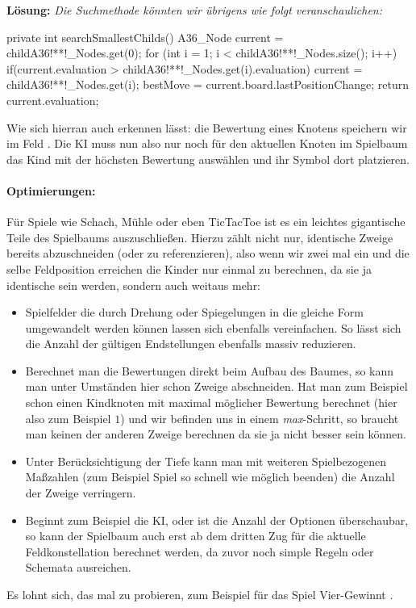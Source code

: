 \documentclass[table]{sopra-base}
\makeatletter
\newenvironment{solution}{\null\par\noindent\textbf{\textcolor{sob@col@uulm@cs}{Lösung:}}\newline\bgroup\color{black}\slshape\ignorespaces}{\egroup}
\makeatother
\begin{document}
\begin{solution}
Die Suchmethode könnten wir übrigens wie folgt veranschaulichen:
\begin{java}[firstnumber=104]
private int searchSmallestChilds(){
    A36_Node current = childA36!**!_Nodes.get(0);
    for (int i = 1; i < childA36!**!_Nodes.size(); i++) {
        if(current.evaluation > childA36!**!_Nodes.get(i).evaluation)
            current = childA36!**!_Nodes.get(i);
    }
    bestMove = current.board.lastPositionChange;
    return current.evaluation;
}
\end{java}
Wie sich hierran auch erkennen lässt: die Bewertung eines Knotens speichern wir im Feld . Die KI muss nun also nur noch für den aktuellen Knoten im Spielbaum das Kind mit der höchsten Bewertung auswählen und ihr Symbol dort platzieren.

\paragraph{Optimierungen:}

Für Spiele wie Schach, Mühle oder eben TicTacToe ist es ein leichtes gigantische Teile des Spielbaums auszuschließen. Hierzu zählt nicht nur, identische Zweige bereits abzuschneiden (oder zu referenzieren), also wenn wir zwei mal ein und die selbe Feldposition erreichen die Kinder nur einmal zu berechnen, da sie ja identische sein werden, sondern auch weitaus mehr:
\begin{itemize}[nolistsep]
    \item Spielfelder die durch Drehung oder Spiegelungen in die gleiche Form umgewandelt werden können lassen sich ebenfalls vereinfachen. So lässt sich die Anzahl der gültigen Endstellungen ebenfalls massiv reduzieren.
    \item Berechnet man die Bewertungen direkt beim Aufbau des Baumes, so kann man unter Umständen hier schon Zweige abschneiden. Hat man zum Beispiel schon einen Kindknoten mit maximal möglicher Bewertung berechnet (hier also zum Beispiel \(1\)) und wir befinden uns in einem \emph{max}-Schritt, so braucht man keinen der anderen Zweige berechnen da sie ja nicht besser sein können.
    \item Unter Berücksichtigung der Tiefe kann man mit weiteren Spielbezogenen Maßzahlen (zum Beispiel Spiel so schnell wie möglich beenden) die Anzahl der Zweige verringern.
    \item Beginnt zum Beispiel die KI, oder ist die Anzahl der Optionen überschaubar, so kann der Spielbaum auch erst ab dem dritten Zug für die aktuelle Feldkonstellation berechnet werden, da zuvor noch simple Regeln oder Schemata ausreichen.
\end{itemize}
Es lohnt sich, das mal zu probieren, zum Beispiel für das Spiel Vier-Gewinnt \Smiley.
\egroup
\end{solution}
\end{document}
